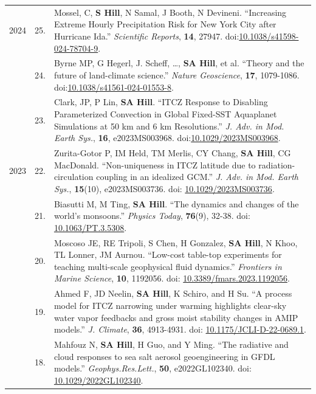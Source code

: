 \documentclass[letterpaper,11pt]{shillcv}
\begin{document}
\begin{longtable}{@{} Y{0.05\textwidth} >{\color{black}} p{0.04\textwidth} @{} L{0.91\textwidth} @{}}
2024 & 25. & Mossel, C, \textbf{S Hill}, N Samal, J Booth, N Devineni. ``Increasing Extreme Hourly Precipitation Risk for New York City after Hurricane Ida.''  \emph{Scientific Reports}, \textbf{14}, 27947.  doi:\href{https://doi.org/10.1038/s41598-024-78704-9}{10.1038/s41598-024-78704-9}.\\
     & 24. & Byrne MP, G Hegerl, J. Scheff, \ldots, \textbf{SA Hill}, et al. ``Theory and the future of land-climate science.''  \emph{Nature Geoscience}, \textbf{17}, 1079-1086.  doi:\href{https://doi.org/10.1038/s41561-024-01553-8}{10.1038/s41561-024-01553-8}.\\
     & 23. & Clark, JP, P Lin, \textbf{SA Hill}. ``ITCZ Response to Disabling Parameterized Convection in Global Fixed-SST Aquaplanet Simulations at 50 km and 6 km Resolutions.'' \emph{J.  Adv. in Mod. Earth Sys.}, \textbf{16}, e2023MS003968.  doi:\href{https://doi.org/10.1029/
2023MS003968}{10.1029/2023MS003968}.\\
2023 & 22. & Zurita-Gotor P, IM Held, TM Merlis, CY Chang, \textbf{SA Hill}, CG MacDonald.  ``Non-uniqueness in ITCZ latitude due to radiation-circulation coupling in an idealized GCM.'' \emph{J.  Adv. in Mod. Earth Sys.}, \textbf{15}(10), e2023MS003736.  doi: \href{https://doi.org/10.1029/2023MS003736}{10.1029/2023MS003736}.\\
     & 21. & Biasutti M, M Ting, \textbf{SA Hill}. ``The dynamics and changes of the world’s monsoons.''  \emph{Physics Today}, \textbf{76}(9), 32-38.  doi: \href{https://doi.org/10.1063/PT.3.5308}{10.1063/PT.3.5308}.\\
     & 20. & Moscoso JE, RE Tripoli, S Chen, H Gonzalez, \textbf{SA Hill}, N Khoo, TL Lonner, JM Aurnou. ``Low-cost table-top experiments for teaching
multi-scale geophysical fluid dynamics.''  \emph{Frontiers in Marine Science}, \textbf{10}, 1192056.  doi:  \href{https://doi.org/10.3389/fmars.2023.1192056}{10.3389/fmars.2023.1192056}.\\
     & 19. & Ahmed F, JD Neelin, \textbf{SA Hill}, K Schiro, and H Su. ``A process model for ITCZ narrowing under warming highlights clear-sky water vapor feedbacks and gross moist stability changes in AMIP models.'' \emph{J. Climate}, \textbf{36}, 4913-4931.  doi: \href{https://doi.org/10.1175/JCLI-D-22-0689.1}{10.1175/JCLI-D-22-0689.1}.\\
     & 18. & Mahfouz N, \textbf{SA Hill}, H Guo, and Y Ming. ``The radiative and cloud responses to sea salt aerosol geoengineering in GFDL models.''  \emph{Geophys.\@ Res.\@ Lett.}, \textbf{50}, e2022GL102340.  doi: \href{https://doi.org/10.1029/2022GL102340}{10.1029/2022GL102340}.\\

\end{longtable}
\end{document}
